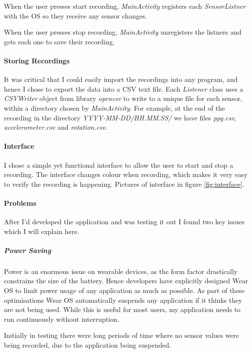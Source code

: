 \documentclass[12pt,a4paper,twoside,openright]{report}
\begin{document}
When the user presses start recording, \emph{MainActivity} registers each
\emph{SensorListner} with the OS so they receive any sensor changes.

When the user presses stop recording, \emph{MainActivity} unregisters the
listners and gets each one to save their recording.

\paragraph{Storing Recordings}

It was critical that I could easily import the recordings into any program, and
hence I chose to export the data into a CSV text file. Each \emph{Listener}
class uses a \emph{CSVWriter} object from library \emph{opencsv} to write to a
unique file for each sensor, within a directory chosen by \emph{MainActivity}.
For example, at the end of the recording in the directory
\emph{YYYY-MM-DD/HH.MM.SS/} we have files \emph{ppg.csv},
\emph{accelerometer.csv} and \emph{rotation.csv}.

\paragraph{Interface}

I chose a simple yet functional interface to allow the user to start and stop
a recording. The interface changes colour when recording, which makes it very
easy to verify the recording is happening. Pictures of interface in figure
\ref{fig:interface}.

\paragraph{Problems}

After I'd developed the application and was testing it out I found two key
issues which I will explain here.

\subparagraph{Power Saving}

Power is an enormous issue on wearable devices, as the form factor drastically
constrains the size of the battery. Hence developers have explicitly designed
Wear OS to limit power usage of any application as much as possible. 
As part of these optimisations Wear OS automatically suspends any application
if it thinks they are not being used. While this is useful for most users, my
application needs to run continuously without interruption.

Initially in testing there were long periods of time where no sensor values
were being recorded, due to the application being suspended.
\end{document}
